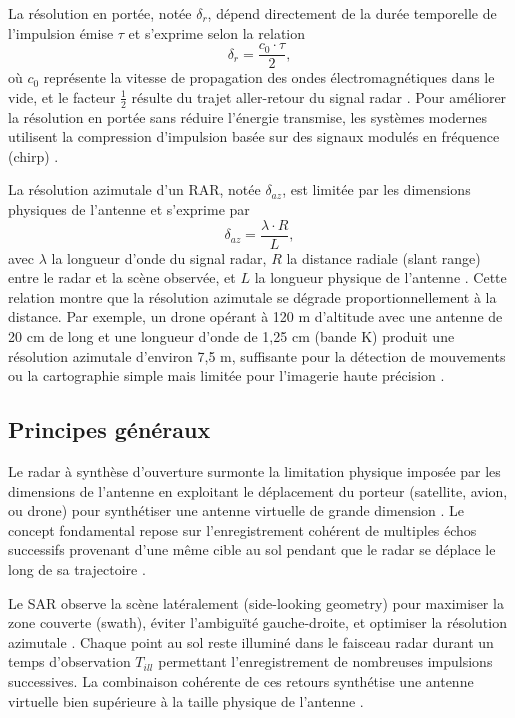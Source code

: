 La résolution en portée, notée $\delta_r$, dépend directement de la durée temporelle de l'impulsion émise $\tau$ et s'exprime selon la relation
\begin{equation}
\delta_r = \frac{c_0 \cdot\tau}{2},
\label{eq:resolution_distance_imagerie}
\end{equation}
où $c_0$ représente la vitesse de propagation des ondes électromagnétiques dans le vide, et le facteur $\frac{1}{2}$ résulte du trajet aller-retour du signal radar \cite{bamler1992comparison, rosen2000sar}. Pour améliorer la résolution en portée sans réduire l'énergie transmise, les systèmes modernes utilisent la compression d'impulsion basée sur des signaux modulés en fréquence (chirp) \cite{cumming2005, curlander1991sar}.

La résolution azimutale d'un RAR, notée $\delta_{az}$, est limitée par les dimensions physiques de l'antenne et s'exprime par
\begin{equation}
\delta_{az} = \frac{\lambda\cdot R}{L},
\label{eq:resolution_azimutale_imagerie}
\end{equation}
avec $\lambda$ la longueur d'onde du signal radar, $R$ la distance radiale (slant range) entre le radar et la scène observée, et $L$ la longueur physique de l'antenne \cite{chan2008sar, elachi2006remote}. Cette relation montre que la résolution azimutale se dégrade proportionnellement à la distance. Par exemple, un drone opérant à 120 m d'altitude avec une antenne de 20 cm de long et une longueur d'onde de 1,25 cm (bande K) produit une résolution azimutale d'environ 7,5 m, suffisante pour la détection de mouvements ou la cartographie simple mais limitée pour l'imagerie haute précision \cite{bamler1998sar}.

\subsection{Principes généraux}

Le radar à synthèse d'ouverture surmonte la limitation physique imposée par les dimensions de l'antenne en exploitant le déplacement du porteur (satellite, avion, ou drone) pour synthétiser une antenne virtuelle de grande dimension \cite{curlander1991sar, rosen2000sar}. Le concept fondamental repose sur l'enregistrement cohérent de multiples échos successifs provenant d'une même cible au sol pendant que le radar se déplace le long de sa trajectoire \cite{elachi2006remote, massonnet1998radar}.

Le SAR observe la scène latéralement (side-looking geometry) pour maximiser la zone couverte (swath), éviter l'ambiguïté gauche-droite, et optimiser la résolution azimutale \cite{bamler1998sar}. Chaque point au sol reste illuminé dans le faisceau radar durant un temps d'observation $T_{ill}$ permettant l'enregistrement de nombreuses impulsions successives. La combinaison cohérente de ces retours synthétise une antenne virtuelle bien supérieure à la taille physique de l'antenne \cite{chan2008sar}.

